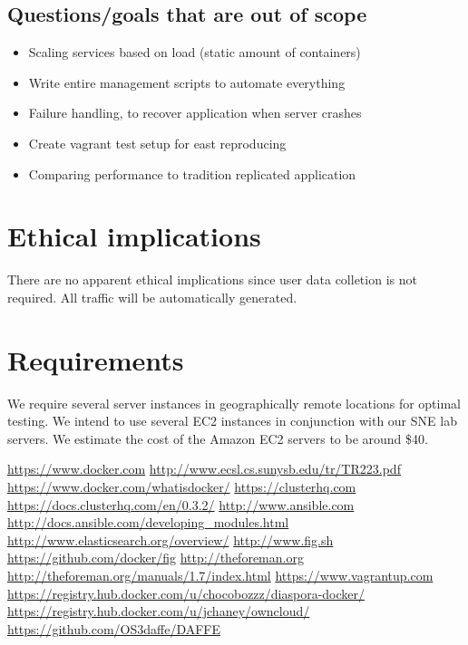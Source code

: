 \documentclass{article}
\begin{document}
\subsection{Questions/goals that are out of scope}
\begin{itemize}
\item{Scaling services based on load (static amount of containers)}
\item{Write entire management scripts to automate everything}
\item{Failure handling, to recover application when server crashes}
\item{Create vagrant test setup for east reproducing}
\item{Comparing performance to tradition replicated application}
\end{itemize}



\section{Ethical implications}
There are no apparent ethical implications since user data colletion is not required. All traffic will be automatically generated.



\section{Requirements}
We require several server instances in geographically remote locations for optimal testing. We intend to use several EC2 instances in conjunction with our SNE lab servers. We estimate the cost of the Amazon EC2 servers to be around \$40.



\begin{thebibliography}{99}
\url{https://www.docker.com}
\url{http://www.ecsl.cs.sunysb.edu/tr/TR223.pdf}
\url{https://www.docker.com/whatisdocker/}
\url{https://clusterhq.com}
\url{https://docs.clusterhq.com/en/0.3.2/}
\url{http://www.ansible.com}
\url{http://docs.ansible.com/developing_modules.html}
\url{http://www.elasticsearch.org/overview/}
\url{http://www.fig.sh}
\url{https://github.com/docker/fig}
\url{http://theforeman.org}
\url{http://theforeman.org/manuals/1.7/index.html}
\url{https://www.vagrantup.com}
\url{https://registry.hub.docker.com/u/chocobozzz/diaspora-docker/}
\url{https://registry.hub.docker.com/u/jchaney/owncloud/}
\url{https://github.com/OS3daffe/DAFFE}

\end{thebibliography}
\end{document}
